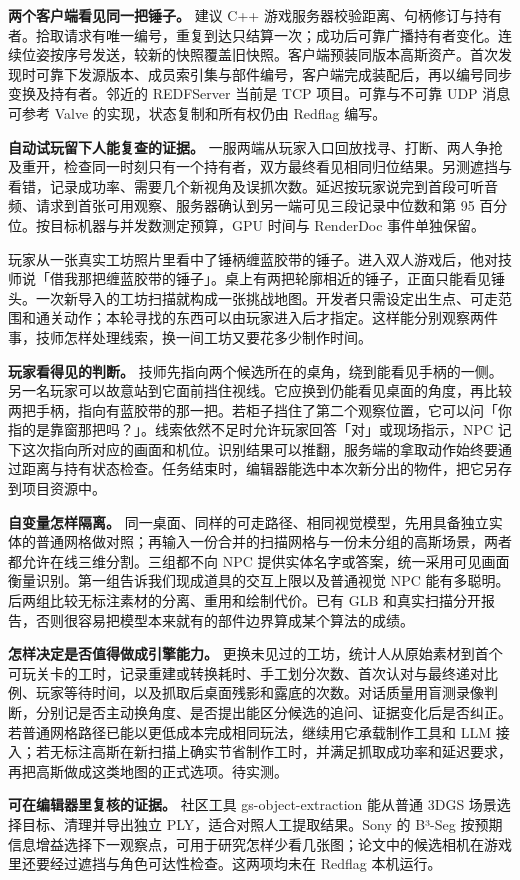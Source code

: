 \documentclass[UTF8,11pt,fontset=fandol,a4paper]{ctexart}
\begin{document}
\textbf{两个客户端看见同一把锤子。} 建议 C++ 游戏服务器校验距离、句柄修订与持有者。拾取请求有唯一编号，重复到达只结算一次；成功后可靠广播持有者变化。连续位姿按序号发送，较新的快照覆盖旧快照。客户端预装同版本高斯资产。首次发现时可靠下发源版本、成员索引集与部件编号，客户端完成装配后，再以编号同步变换及持有者。邻近的 REDFServer 当前是 TCP 项目。可靠与不可靠 UDP 消息可参考 Valve 的实现，状态复制和所有权仍由 Redflag 编写。 

\textbf{自动试玩留下人能复查的证据。} 一服两端从玩家入口回放找寻、打断、两人争抢及重开，检查同一时刻只有一个持有者，双方最终看见相同归位结果。另测遮挡与看错，记录成功率、需要几个新视角及误抓次数。延迟按玩家说完到首段可听音频、请求到首张可用观察、服务器确认到另一端可见三段记录中位数和第 95 百分位。按目标机器与并发数测定预算，GPU 时间与 RenderDoc 事件单独保留。 


玩家从一张真实工坊照片里看中了锤柄缠蓝胶带的锤子。进入双人游戏后，他对技师说「借我那把缠蓝胶带的锤子」。桌上有两把轮廓相近的锤子，正面只能看见锤头。一次新导入的工坊扫描就构成一张挑战地图。开发者只需设定出生点、可走范围和通关动作；本轮寻找的东西可以由玩家进入后才指定。这样能分别观察两件事，技师怎样处理线索，换一间工坊又要花多少制作时间。

\textbf{玩家看得见的判断。} 技师先指向两个候选所在的桌角，绕到能看见手柄的一侧。另一名玩家可以故意站到它面前挡住视线。它应换到仍能看见桌面的角度，再比较两把手柄，指向有蓝胶带的那一把。若柜子挡住了第二个观察位置，它可以问「你指的是靠窗那把吗？」。线索依然不足时允许玩家回答「对」或现场指示，NPC 记下这次指向所对应的画面和机位。识别结果可以推翻，服务端的拿取动作始终要通过距离与持有状态检查。任务结束时，编辑器能选中本次新分出的物件，把它另存到项目资源中。

\textbf{自变量怎样隔离。} 同一桌面、同样的可走路径、相同视觉模型，先用具备独立实体的普通网格做对照；再输入一份合并的扫描网格与一份未分组的高斯场景，两者都允许在线三维分割。三组都不向 NPC 提供实体名字或答案，统一采用可见画面衡量识别。第一组告诉我们现成道具的交互上限以及普通视觉 NPC 能有多聪明。后两组比较无标注素材的分离、重用和绘制代价。已有 GLB 和真实扫描分开报告，否则很容易把模型本来就有的部件边界算成某个算法的成绩。

\textbf{怎样决定是否值得做成引擎能力。} 更换未见过的工坊，统计人从原始素材到首个可玩关卡的工时，记录重建或转换耗时、手工划分次数、首次认对与最终递对比例、玩家等待时间，以及抓取后桌面残影和露底的次数。对话质量用盲测录像判断，分别记是否主动换角度、是否提出能区分候选的追问、证据变化后是否纠正。若普通网格路径已能以更低成本完成相同玩法，继续用它承载制作工具和 LLM 接入；若无标注高斯在新扫描上确实节省制作工时，并满足抓取成功率和延迟要求，再把高斯做成这类地图的正式选项。待实测。

\textbf{可在编辑器里复核的证据。} 社区工具 gs-object-extraction 能从普通 3DGS 场景选择目标、清理并导出独立 PLY，适合对照人工提取结果。Sony 的 B³-Seg 按预期信息增益选择下一观察点，可用于研究怎样少看几张图；论文中的候选相机在游戏里还要经过遮挡与角色可达性检查。这两项均未在 Redflag 本机运行。\quad{}
\end{document}
